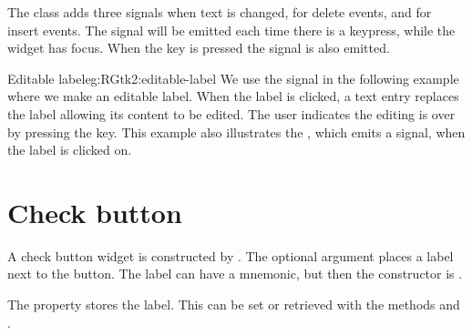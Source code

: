 The  class adds three signals  when
text is changed,  for delete events, and
 for insert events. The  signal will
be emitted each time there is a keypress, while the widget has
focus. When the  key is pressed the  signal
is also emitted. 

\begin{example}{Editable label}{eg:RGtk2:editable-label}
We use the  signal in the following example where we
make an editable label. When the label is clicked, a text entry
replaces the label allowing its content to be edited. The user
indicates the editing is over by pressing the  key. This
example also illustrates the , which emits a
 signal, when the label is clicked on.  
\begin{Schunk}
\end{Schunk}
\end{example}


\section{Check button}
\label{sec:RGtk2:gtkCheckbox}

A check button widget is constructed by . The
optional argument  places a label next
to the button. The label can have a mnemonic, but then the constructor
is  .

The  property stores the label. This can be set or
retrieved with the methods  and
. 

